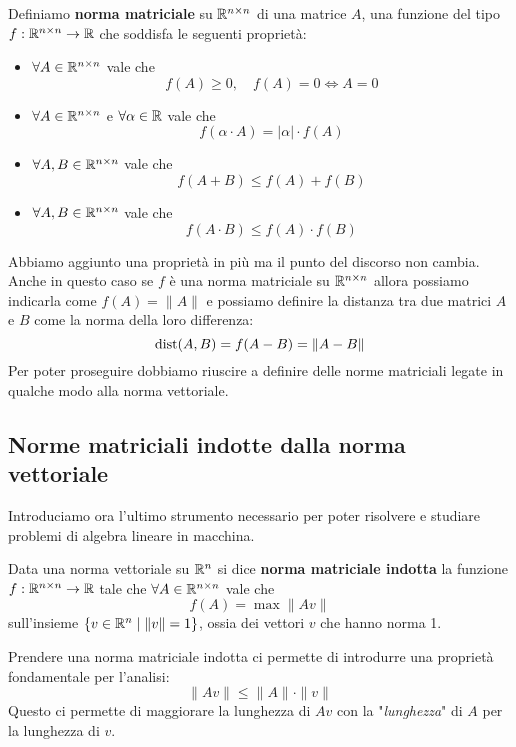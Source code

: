\begin{definition}
	Definiamo \textbf{norma matriciale} su $\mathbb{R}^{n \times n}$ di una matrice $A$, una funzione del tipo
	$f : \mathbb{R}^{n \times n} \to \mathbb{R}$ che soddisfa le seguenti proprietà:
	\begin{itemize}
		\item $\forall A \in \mathbb{R}^{n \times n}$ vale che
		      \[ f(A) \geq 0, \quad f(A) = 0 \Leftrightarrow A = 0 \]
		\item $\forall A \in \mathbb{R}^{n \times n}$ e $\forall \alpha \in \mathbb{R}$ vale che
		      \[ f(\alpha \cdot A) = |\alpha| \cdot f(A) \]
		\item $\forall A, B \in \mathbb{R}^{n \times n}$ vale che
		      \[ f(A + B) \leq f(A) + f(B) \]
		\item $\forall A, B \in \mathbb{R}^{n \times n}$ vale che
		      \[ f(A \cdot B) \leq f(A) \cdot f(B) \]
	\end{itemize}
\end{definition}

Abbiamo aggiunto una proprietà in più ma il punto del discorso non cambia. Anche in questo caso se $f$ è una
norma matriciale su $\mathbb{R}^{n \times n}$ allora possiamo indicarla come $f(A) = \| A \|$ e possiamo definire la
distanza tra due matrici $A$ e $B$ come la norma della loro differenza:
\[ \operatorname{dist}(A, B) = f(A - B) = \| A - B \| \]
Per poter proseguire dobbiamo riuscire a definire delle norme matriciali legate in qualche modo alla norma
vettoriale.

\subsection{Norme matriciali indotte dalla norma vettoriale}
Introduciamo ora l'ultimo strumento necessario per poter risolvere e studiare problemi di algebra lineare in
macchina.
\begin{definition}
	Data una norma vettoriale su $\mathbb{R}^n$ si dice \textbf{norma matriciale indotta} la funzione
	$f : \mathbb{R}^{n \times n} \to \mathbb{R}$ tale che $\forall A \in \mathbb{R}^{n \times n}$ vale che
	\[ f(A) = \max \| A v \| \]
	sull'insieme $\{ v \in \mathbb{R}^n \mid \| v \| = 1 \}$, ossia dei vettori $v$ che hanno norma 1.
\end{definition}

Prendere una norma matriciale indotta ci permette di introdurre una proprietà fondamentale per l'analisi:
\[ \| A v \| \leq \| A \| \cdot \| v \| \]
Questo ci permette di maggiorare la lunghezza di $A v$ con la "\emph{lunghezza}" di $A$ per la lunghezza di $v$.

